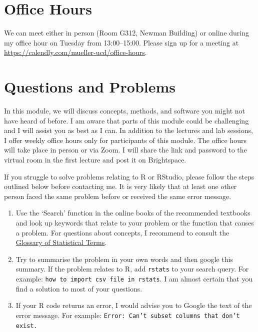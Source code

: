 \documentclass[abstract=on,parskip=full,headings=standardclasses,fontsize=11pt,paper=a4]{scrartcl}
\begin{document}
\section*{Office Hours}

We can meet either in person (Room G312, Newman Building) or online during my office hour on Tuesday from 13:00--15:00. Please sign up for a meeting at  \href{https://calendly.com/mueller-ucd/15min}{https://calendly.com/mueller-ucd/office-hours}.  

\section*{Questions and Problems}

In this module, we will discuss concepts, methods, and software you might not have heard of before. I am  aware that parts of this module could be challenging and I will assist you as best as I can. In addition to the lectures and lab sessions, I  offer weekly office hours only  for  participants of this module. The office hours will take place in person or via Zoom. I will share the link and password to the virtual room in the first lecture and post it on Brightspace. 

If you struggle to solve problems relating to \textsf{R} or RStudio, please follow the steps outlined below before contacting me. It is very likely that at least one other person faced the same problem before or received the same error message. %
\begin{enumerate}
\item Use the `Search' function in the online books of the recommended textbooks \autocite{ismay20,wickham17,healy19} and look up keywords that relate to your problem or the function that causes a problem. For questions about concepts, I recommend to consult the \href{https://hbiostat.org/doc/glossary.pdf}{Glossary of Statistical Terms}.
\item Try to summarise the problem in your own words and then google this summary. If the problem relates to \textsf{R}, add \texttt{rstats} to your search query. For example: \texttt{how to import csv file in rstats}. I am almost certain that you find a solution to most of your questions. 
\item If your \textsf{R} code returns an error, I would advise you to Google the text of the error message.  For example: \texttt{Error: Can't subset columns that don't exist.}
\end{enumerate}
\end{document}
